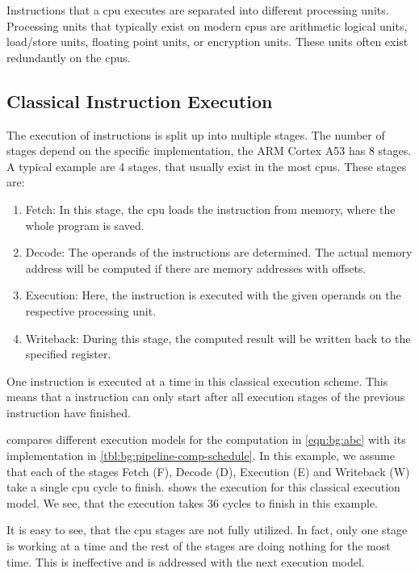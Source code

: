 Instructions that a \ac{cpu} executes are separated into different processing units.
Processing units that typically exist on modern \acp{cpu} are arithmetic logical units, load/store units, floating point units, or encryption units.
These units often exist redundantly on the \acp{cpu}.

\subsection{Classical Instruction Execution}
The execution of instructions is split up into multiple stages.
The number of stages depend on the specific implementation, \eg the ARM Cortex A53 has 8 stages.
A typical example are 4 stages, that usually exist in the most \acp{cpu}.
These stages are:
\begin{enumerate}
    \item Fetch: 
        In this stage, the \ac{cpu} loads the instruction from memory, where the whole program is saved. 
    \item Decode:
        The operands of the instructions are determined.
        The actual memory address will be computed if there are memory addresses with offsets.
    \item Execution:
        Here, the instruction is executed with the given operands on the respective processing unit.
    \item Writeback:
        During this stage, the computed result will be written back to the specified register.
\end{enumerate}

One instruction is executed at a time in this classical execution scheme.
This means that a instruction can only start after all execution stages of the previous instruction have finished.

 compares different execution models for the computation in \cref{eqn:bg:abc} with its implementation in \cref{tbl:bg:pipeline-comp-schedule}.
In this example, we assume that each of the stages Fetch (F), Decode (D), Execution (E) and Writeback (W) take a single \ac{cpu} cycle to finish.
 shows the execution for this classical execution model.
We see, that the execution takes 36 cycles to finish in this example.

It is easy to see, that the \ac{cpu} stages are not fully utilized.
In fact, only one stage is working at a time and the rest of the stages are doing nothing for the most time.
This is ineffective and is addressed with the next execution model.

